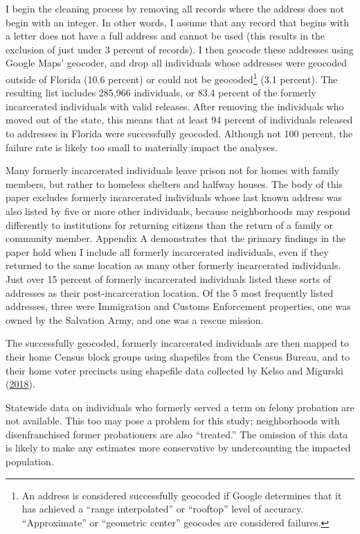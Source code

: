 \documentclass[
  12pt,
]{article}
\begin{document}
I begin the cleaning process by removing all records where the address does not begin with an integer. In other words, I assume that any record that begins with a letter does not have a full address and cannot be used (this results in the exclusion of just under 3 percent of records). I then geocode these addresses using Google Maps' geocoder, and drop all individuals whose addresses were geocoded outside of Florida (10.6 percent) or could not be geocoded\footnote{An address is considered successfully geocoded if Google determines that it has achieved a ``range interpolated'' or ``rooftop'' level of accuracy. ``Approximate'' or ``geometric center'' geocodes are considered failures.} (3.1 percent). The resulting list includes 285,966 individuals, or 83.4 percent of the formerly incarcerated individuals with valid releases. After removing the individuals who moved out of the state, this means that at least 94 percent of individuals released to addresses in Florida were successfully geocoded. Although not 100 percent, the failure rate is likely too small to materially impact the analyses.

Many formerly incarcerated individuals leave prison not for homes with family members, but rather to homeless shelters and halfway houses. The body of this paper excludes formerly incarcerated individuals whose last known address was also listed by five or more other individuals, because neighborhoods may respond differently to institutions for returning citizens than the return of a family or community member. Appendix A demonstrates that the primary findings in the paper hold when I include all formerly incarcerated individuals, even if they returned to the same location as many other formerly incarcerated individuals. Just over 15 percent of formerly incarcerated individuals listed these sorts of addresses as their post-incarceration location. Of the 5 most frequently listed addresses, three were Immigration and Customs Enforcement properties, one was owned by the Salvation Army, and one was a rescue mission.

The successfully geocoded, formerly incarcerated individuals are then mapped to their home Census block groups using shapefiles from the Census Bureau, and to their home voter precincts using shapefile data collected by Kelso and Migurski (\protect\hyperlink{ref-Kelso2018}{2018}).

Statewide data on individuals who formerly served a term on felony probation are not available. This too may pose a problem for this study; neighborhoods with disenfranchised former probationers are also ``treated.'' The omission of this data is likely to make any estimates more conservative by undercounting the impacted population.
\end{document}
